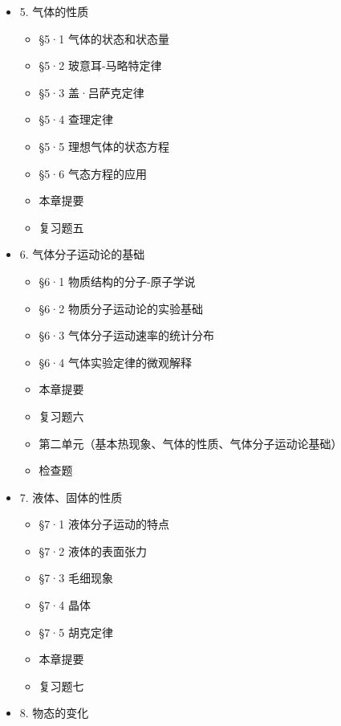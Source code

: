 \begin{itemize}
  \begin{itemize}
  \tightlist
  \item
    §4·1 温度和温度的测量
  \item
    §4·2 热量 燃烧值 比热
  \item
    §4·3 热平衡方程
  \item
    §4·4 物体的热膨胀
  \item
    §4·5 热传递的方式
  \item
    本章提要
  \item
    复习题四
  \end{itemize}
\item
  5. 气体的性质

  \begin{itemize}
  \tightlist
  \item
    §5·1 气体的状态和状态量
  \item
    §5·2 玻意耳-马略特定律
  \item
    §5·3 盖·吕萨克定律
  \item
    §5·4 查理定律
  \item
    §5·5 理想气体的状态方程
  \item
    §5·6 气态方程的应用
  \item
    本章提要
  \item
    复习题五
  \end{itemize}
\item
  6. 气体分子运动论的基础

  \begin{itemize}
  \tightlist
  \item
    §6·1 物质结构的分子-原子学说
  \item
    §6·2 物质分子运动论的实验基础
  \item
    §6·3 气体分子运动速率的统计分布
  \item
    §6·4 气体实验定律的微观解释
  \item
    本章提要
  \item
    复习题六
  \item
    第二单元（基本热现象、气体的性质、气体分子运动论基础）
  \item
    检查题
  \end{itemize}
\item
  7. 液体、固体的性质

  \begin{itemize}
  \tightlist
  \item
    §7·1 液体分子运动的特点
  \item
    §7·2 液体的表面张力
  \item
    §7·3 毛细现象
  \item
    §7·4 晶体
  \item
    §7·5 胡克定律
  \item
    本章提要
  \item
    复习题七
  \end{itemize}
\item
  8. 物态的变化


\end{itemize}
